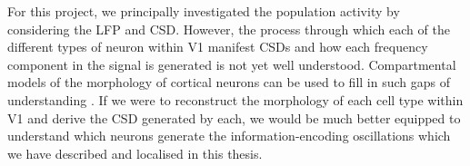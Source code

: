 
For this project, we principally investigated the population activity by considering the \ac{LFP} and \ac{CSD}.
However, the process through which each of the different types of neuron within \ac{V1} manifest \acp{CSD} and how each frequency component in the signal is generated is not yet well understood.
Compartmental models of the morphology of cortical neurons can be used to fill in such gaps of understanding \citep{Leski2013}.
If we were to reconstruct the morphology of each cell type within \ac{V1} and derive the \ac{CSD} generated by each, we would be much better equipped to understand which neurons generate the information-encoding oscillations which we have described and localised in this thesis.
